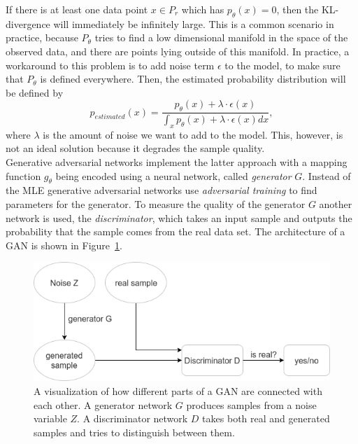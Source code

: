 If there is at least one data point $x \in P_r$ which has $p_\theta(x) = 0$, then the KL-divergence will immediately be infinitely large. This is a common scenario in practice, because $P_\theta$ tries to find a low dimensional manifold in the space of the observed data, and there are points lying outside of this manifold. In practice, a workaround to this problem is to add noise term $\epsilon$ to the model, to make sure that $P_\theta$ is defined everywhere. Then, the estimated probability distribution will be defined by 
\begin{equation*}
p_{estimated}(x) = \frac{p_\theta(x) + \lambda \cdot \epsilon(x)}{\int_x p_\theta(x) + \lambda \cdot \epsilon(x) dx}, 
\end{equation*}
where $\lambda$ is the amount of noise we want to add to the model. This, however, is not an ideal solution because it degrades the sample quality. \\
  
\indent Generative adversarial networks implement the latter approach with a mapping function $g_\theta$ being encoded using a neural network, called \textit{generator} $G$. Instead of the MLE generative adversarial networks use \textit{adversarial training} to find parameters for the generator. To measure the quality of the generator $G$ another network is used, the \textit{discriminator}, which takes an input sample and outputs the probability that the sample comes from the real data set. The architecture of a GAN is shown in Figure~\ref{fig:gan}.\\

\begin{figure}[h]
	\includegraphics[width=\textwidth]{figures/gan}
	\caption{A visualization of how different parts of a GAN are connected with each other. A generator network $G$ produces samples from a noise variable $Z$. A discriminator network $D$ takes both real and generated samples and tries to distinguish between them.}
	\label{fig:gan}
\end{figure}

